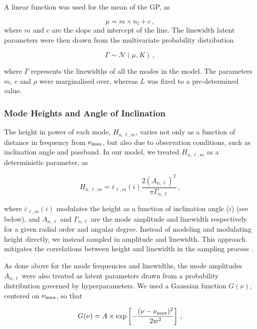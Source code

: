 \documentclass[12pt]{article}
\newcommand{\numax}{\mbox{$\nu_{\rm max}$}\xspace}
\begin{document}
A linear function was used for the mean of the GP, as

\begin{equation}\label{eq:gpmean}
	\mu = m \times n_{\textrm{f}} + c\, ,
\end{equation}
where $m$ and $c$ are the slope and intercept of the line. The linewidth latent parameters were then drawn from the multivariate probability distribution

\begin{equation}\label{eq:gammagp}
	\Gamma \sim \mathcal{N}(\mu, \underline{K})\, ,
\end{equation}

\noindent where $\Gamma$ represents the linewidths of all the modes in the model. The parameters $m$, $c$ and $\rho$ were marginalised over, whereas $L$ was fixed to a pre-determined value.

\subsubsection{Mode Heights and Angle of Inclination}
The height in power of each mode, $H_{n, \ell, m}$, varies not only as a function of distance in frequency from \numax, but also due to observation conditions, such as inclination angle and passband. In our model, we treated $H_{n, \ell, m}$ as a deterministic parameter, as

\begin{equation}\label{eq:height}
	H_{n, \ell, m} =  \varepsilon_{\ell, m}(i) \frac{2 (A_{n, \ell})^2}{\pi \Gamma_{n, \ell}}\, ,
\end{equation}

\noindent where $\varepsilon_{\ell, m}(i)$ modulates the height as a function of inclination angle ($i$) (see below), and $A_{n, \ell}$ and $\Gamma_{n, \ell}$ are the mode amplitude and linewidth respectively for a given radial order and angular degree. Instead of modeling and modulating height directly, we instead sampled in amplitude and linewidth. This approach mitigates the correlations between height and linewidth in the sampling process \cite{toutain+appourchaux1994}.

As done above for the mode frequencies and linewidths, the mode amplitudes $A_{n,\ell}$ were also treated as latent parameters drawn from a probability distribution governed by hyperparameters. We used a Gaussian function $G(\nu)$, centered on $\numax$, so that

\begin{equation}\label{eq:amplitude}
	G(\nu) = A \times \exp\left[-\frac{(\nu - \numax)^2}{2w^2}\right]\, ,
\end{equation}
\end{document}

